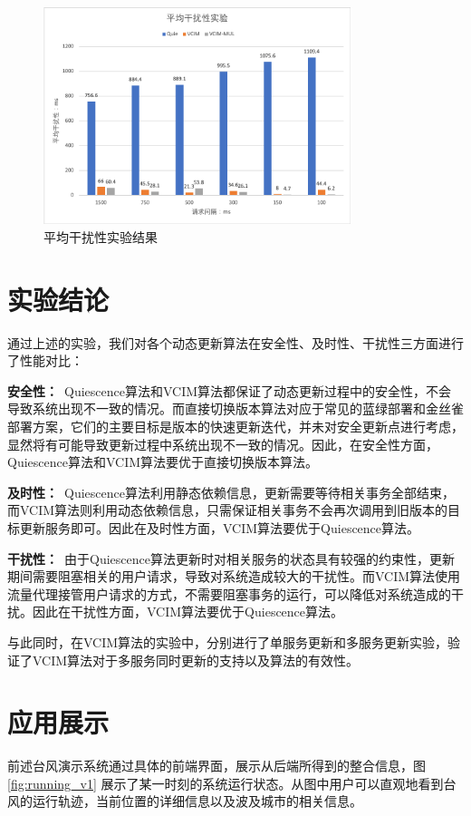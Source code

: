 \documentclass[macfonts,master]{njuthesis}
\begin{document}
\begin{figure}[!htbp]
  \centering
  \includegraphics[width= 0.8\textwidth]{image/average_disruption.png}
  \caption{平均干扰性实验结果}
  \label{fig:average_disruption}
\end{figure}

\section{实验结论}
通过上述的实验，我们对各个动态更新算法在安全性、及时性、干扰性三方面进行了性能对比：

\textbf{安全性：}~Quiescence算法和VCIM算法都保证了动态更新过程中的安全性，不会导致系统出现不一致的情况。而直接切换版本算法对应于常见的蓝绿部署和金丝雀部署方案，它们的主要目标是版本的快速更新迭代，并未对安全更新点进行考虑，显然将有可能导致更新过程中系统出现不一致的情况。因此，在安全性方面，Quiescence算法和VCIM算法要优于直接切换版本算法。

\textbf{及时性：}~Quiescence算法利用静态依赖信息，更新需要等待相关事务全部结束，而VCIM算法则利用动态依赖信息，只需保证相关事务不会再次调用到旧版本的目标更新服务即可。因此在及时性方面，VCIM算法要优于Quiescence算法。

\textbf{干扰性：}~由于Quiescence算法更新时对相关服务的状态具有较强的约束性，更新期间需要阻塞相关的用户请求，导致对系统造成较大的干扰性。而VCIM算法使用流量代理接管用户请求的方式，不需要阻塞事务的运行，可以降低对系统造成的干扰。因此在干扰性方面，VCIM算法要优于Quiescence算法。

与此同时，在VCIM算法的实验中，分别进行了单服务更新和多服务更新实验，验证了VCIM算法对于多服务同时更新的支持以及算法的有效性。

\section{应用展示}
前述台风演示系统通过具体的前端界面，展示从后端所得到的整合信息，图\ref{fig:running_v1} 展示了某一时刻的系统运行状态。从图中用户可以直观地看到台风的运行轨迹，当前位置的详细信息以及波及城市的相关信息。
\end{document}
